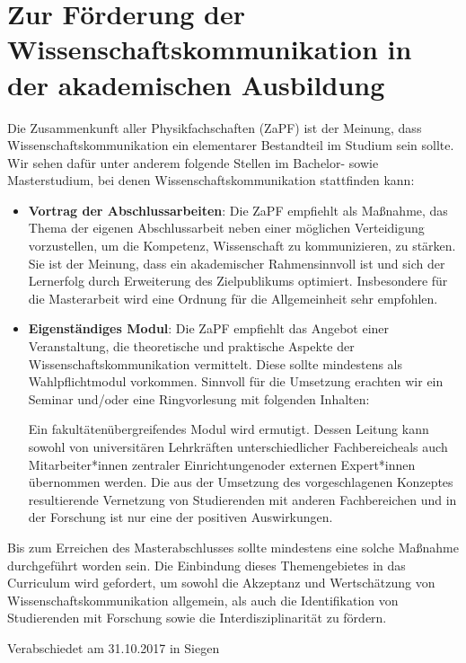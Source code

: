 \documentclass[DIV=calc]{scrartcl}
\begin{document}
\section*{Zur Förderung der Wissenschaftskommunikation in der akademischen Ausbildung}
Die Zusammenkunft aller Physikfachschaften (ZaPF) ist der Meinung, dass Wissenschaftskommunikation ein elementarer Bestandteil im Studium sein sollte.
Wir sehen dafür unter anderem folgende Stellen im Bachelor- sowie Masterstudium, bei denen Wissenschaftskommunikation stattfinden kann:
\begin{itemize}
    \item [] \textbf{Vortrag der Abschlussarbeiten}: Die ZaPF empfiehlt als Maßnahme, das Thema der eigenen Abschlussarbeit neben einer möglichen Verteidigung vorzustellen, um die Kompetenz, Wissenschaft zu kommunizieren, zu stärken. Sie ist der Meinung, dass ein akademischer Rahmen\footnotemark[1] sinnvoll ist und sich der Lernerfolg durch Erweiterung des Zielpublikums optimiert. Insbesondere für die Masterarbeit wird eine Ordnung für die Allgemeinheit sehr empfohlen.
\item [] \textbf{Eigenständiges Modul}: Die ZaPF empfiehlt das Angebot einer Veranstaltung, die theoretische und praktische Aspekte der Wissenschaftskommunikation vermittelt. Diese sollte mindestens als Wahlpflichtmodul vorkommen. Sinnvoll für die Umsetzung erachten wir ein Seminar und/oder eine Ringvorlesung mit folgenden Inhalten:
Ein fakultätenübergreifendes Modul wird ermutigt. Dessen Leitung kann
sowohl von universitären Lehrkräften unterschiedlicher Fachbereiche\footnotemark[2] als auch Mitarbeiter*innen zentraler Einrichtungen\footnotemark[3] oder externen Expert*innen übernommen werden. Die aus der Umsetzung des vorgeschlagenen Konzeptes
resultierende Vernetzung von Studierenden mit anderen Fachbereichen und
in der Forschung ist nur eine der positiven Auswirkungen.
\end{itemize}
Bis zum Erreichen des Masterabschlusses sollte mindestens eine solche Maßnahme durchgeführt worden sein. Die Einbindung dieses Themengebietes in das
Curriculum wird gefordert, um sowohl die Akzeptanz und Wertschätzung von
Wissenschaftskommunikation allgemein, als auch die Identifikation von Studierenden
mit Forschung sowie die Interdisziplinarität zu fördern.

\vspace{-0.5\baselineskip}
    \begin{flushright}
        Verabschiedet am 31.10.2017 in Siegen
    \end{flushright}
\end{document}
